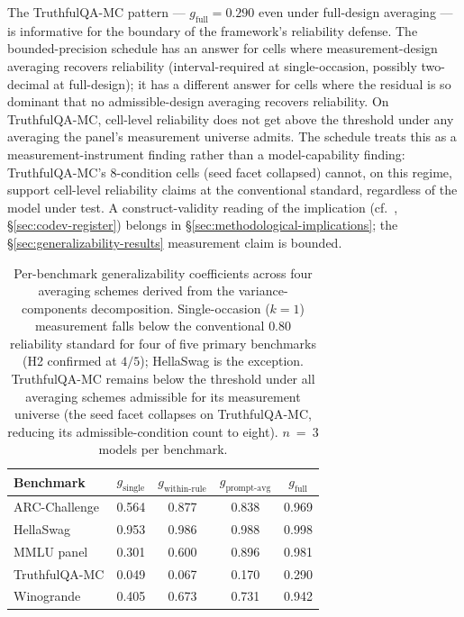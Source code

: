 \documentclass[11pt]{article}
\begin{document}
The TruthfulQA-MC pattern --- $g_{\mathrm{full}} = 0.290$ even under full-design averaging --- is informative for the boundary of the framework's reliability defense. The bounded-precision schedule has an answer for cells where measurement-design averaging recovers reliability (interval-required at single-occasion, possibly two-decimal at full-design); it has a different answer for cells where the residual is so dominant that no admissible-design averaging recovers reliability. On TruthfulQA-MC, cell-level reliability does not get above the threshold under any averaging the panel's measurement universe admits. The schedule treats this as a measurement-instrument finding rather than a model-capability finding: TruthfulQA-MC's $8$-condition cells (seed facet collapsed) cannot, on this regime, support cell-level reliability claims at the conventional standard, regardless of the model under test. A construct-validity reading of the implication (cf.~\citet{bean2025measuring}, §\ref{sec:codev-register}) belongs in §\ref{sec:methodological-implications}; the §\ref{sec:generalizability-results} measurement claim is bounded.

\begin{table}[h]
\centering
\caption{Per-benchmark generalizability coefficients across four averaging schemes derived from the variance-components decomposition. Single-occasion ($k = 1$) measurement falls below the conventional $0.80$ reliability standard for four of five primary benchmarks (H2 confirmed at $4/5$); HellaSwag is the exception. TruthfulQA-MC remains below the threshold under all averaging schemes admissible for its measurement universe (the seed facet collapses on TruthfulQA-MC, reducing its admissible-condition count to eight). $n$~=~3 models per benchmark.}
\label{tab:generalizability}
\begin{tabular}{lcccc}
\toprule
Benchmark & $g_{\mathrm{single}}$ & $g_{\mathrm{within\text{-}rule}}$ & $g_{\mathrm{prompt\text{-}avg}}$ & $g_{\mathrm{full}}$ \\
\midrule
ARC-Challenge & 0.564 & 0.877 & 0.838 & 0.969 \\
HellaSwag     & 0.953 & 0.986 & 0.988 & 0.998 \\
MMLU panel    & 0.301 & 0.600 & 0.896 & 0.981 \\
TruthfulQA-MC & 0.049 & 0.067 & 0.170 & 0.290 \\
Winogrande    & 0.405 & 0.673 & 0.731 & 0.942 \\
\bottomrule
\end{tabular}
\end{table}
\end{document}
